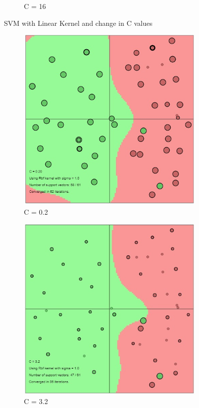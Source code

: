\documentclass[12pt]{report}
\begin{document}
{\begin{figure}[!ht]
\begin{subfigure}{.32\textwidth}
		\caption{C = 16}
		\label{fig:C16}
	\end{subfigure}
	\caption{SVM with Linear Kernel and change in C values}
	\label{fig:C}
\end{figure}

\begin{figure}[!ht] 
	\centering
	\begin{subfigure}{.32\textwidth}
		\centering
		\includegraphics[width=.65\linewidth]{RBF_C(0.2).jpg}
		\caption{C = 0.2}
		\label{fig:RBF0.2}
	\end{subfigure}%
	\begin{subfigure}{.32\textwidth}
		\centering
		\includegraphics[width=.65\linewidth]{RBF_C(3.2).jpg}
		\caption{C = 3.2}
		\label{fig:RBF3.2}
	\end{subfigure}
	\begin{subfigure}{.32\textwidth}
		\centering

\end{subfigure}
\end{figure}}
\end{document}
